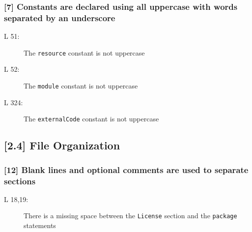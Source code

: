 \subsubsection*{[7] Constants are declared using all uppercase with words separated by an underscore}
\begin{description}
	\item[L 51:] The {\tt resource} constant is not uppercase
	\item[L 52:] The {\tt module} constant is not uppercase
	\item[L 324:] The {\tt externalCode} constant is not uppercase
\end{description}

\subsection*{[2.4] File Organization}

\subsubsection*{[12] Blank lines and optional comments are used to separate sections}
\begin{description}
	\item[L 18,19:] There is a missing space between the {\tt License} section and the {\tt package} statements
\end{description}

